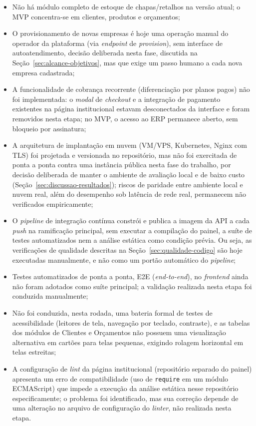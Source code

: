 \begin{itemize}
  \item Não há módulo completo de estoque de chapas/retalhos na versão atual; o MVP concentra-se em clientes, produtos e orçamentos;
  \item O provisionamento de novas empresas é hoje uma operação manual do operador da plataforma (via \textit{endpoint} de \textit{provision}), sem interface de autoatendimento, decisão deliberada nesta fase, discutida na Seção~\ref{sec:alcance-objetivos}, mas que exige um passo humano a cada nova empresa cadastrada;
  \item A funcionalidade de cobrança recorrente (diferenciação por planos pagos) não foi implementada: o \textit{modal} de \textit{checkout} e a integração de pagamento existentes na página institucional estavam desconectados da interface e foram removidos nesta etapa; no MVP, o acesso ao ERP permanece aberto, sem bloqueio por assinatura;
  \item A arquitetura de implantação em nuvem (VM/VPS, Kubernetes, Nginx com TLS) foi projetada e versionada no repositório, mas não foi exercitada de ponta a ponta contra uma instância pública nesta fase do trabalho, por decisão deliberada de manter o ambiente de avaliação local e de baixo custo (Seção~\ref{sec:discussao-resultados}); riscos de paridade entre ambiente local e nuvem real, além do desempenho sob latência de rede real, permanecem não verificados empiricamente;
  \item O \textit{pipeline} de integração contínua constrói e publica a imagem da API a cada \textit{push} na ramificação principal, sem executar a compilação do painel, a suíte de testes automatizados nem a análise estática como condição prévia. Ou seja, as verificações de qualidade descritas na Seção~\ref{sec:qualidade-codigo} são hoje executadas manualmente, e não como um portão automático do \textit{pipeline};
  \item Testes automatizados de ponta a ponta, E2E (\textit{end-to-end}), no \textit{frontend} ainda não foram adotados como suíte principal; a validação realizada nesta etapa foi conduzida manualmente;
  \item Não foi conduzida, nesta rodada, uma bateria formal de testes de acessibilidade (leitores de tela, navegação por teclado, contraste), e as tabelas dos módulos de Clientes e Orçamentos não possuem uma visualização alternativa em cartões para telas pequenas, exigindo rolagem horizontal em telas estreitas;
  \item A configuração de \textit{lint} da página institucional (repositório separado do painel) apresenta um erro de compatibilidade (uso de \texttt{require} em um módulo ECMAScript) que impede a execução da análise estática nesse repositório especificamente; o problema foi identificado, mas sua correção depende de uma alteração no arquivo de configuração do \textit{linter}, não realizada nesta etapa.
\end{itemize}

